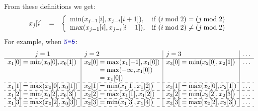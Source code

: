 \documentclass{article}
\begin{document}
\begin{enumerate}
          From these definitions we get:
          \begin{displaymath}\begin{array}{rcl}
                  \xji{j}{i} & = & \left\{
                  \begin{array}{ll}
                      \min(\xji{j-1}{i}, \xji{j-i}{i+1}), & \textrm{if $(i \bmod 2) = (j \bmod 2)$}    \\
                      \max(\xji{j-1}{i}, \xji{j-i}{i-1}), & \textrm{if $(i \bmod 2) \neq (j \bmod 2)$}
                  \end{array} \right. %
              \end{array}\end{displaymath}
          For example, when $\code{N=5}$:
          \begin{displaymath}\begin{array}{l|l|l|l}
                  \multicolumn{1}{c}{j=1}                   & j=2                                              & j=3                                              & \ldots \\\hline
                  \xji{1}{0} = \min(\xji{0}{0}, \xji{0}{1})
                                                            & \xji{2}{0} = \max(\xji{1}{-1}, \xji{1}{0})
                                                            & \xji{3}{0} = \min(\xji{2}{0}, \xji{2}{1})        & \ldots                                                    \\
                                                            & \phantom{\xji{2}{0}} = \max(-\infty, \xji{1}{0}) &                                                  &        \\
                                                            & \phantom{\xji{2}{0}} = \xji{1}{0})               &                                                  &        \\\hdashline
                  \xji{1}{1} = \max(\xji{0}{0}, \xji{0}{1}) & \xji{2}{1} = \min(\xji{1}{1}, \xji{1}{2})        & \xji{3}{1} = \max(\xji{2}{0}, \xji{2}{1})        & \ldots \\\hdashline
                  \xji{1}{2} = \min(\xji{0}{2}, \xji{0}{3}) & \xji{2}{2} = \max(\xji{1}{1}, \xji{1}{2})        & \xji{3}{2} = \min(\xji{2}{2}, \xji{2}{3})        & \ldots \\\hdashline
                  \xji{1}{3} = \max(\xji{0}{2}, \xji{0}{3}) & \xji{2}{3} = \min(\xji{1}{3}, \xji{1}{4})        & \xji{3}{3} = \max(\xji{2}{2}, \xji{2}{3})        & \ldots \\\hdashline

\end{array}
\end{displaymath}
\end{enumerate}
\end{document}
